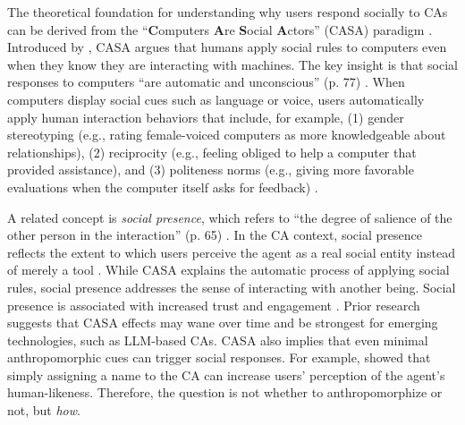 \documentclass[preprint,review,12pt,authoryear,nonatbib]{elsarticle}
\begin{document}
The theoretical foundation for understanding why users respond socially to CAs can be derived from the ``\textbf{C}omputers \textbf{A}re \textbf{S}ocial \textbf{A}ctors'' (CASA) paradigm \parencite{nass2000researching,nass1994computers}. Introduced by \textcite{nass1994computers}, CASA argues that humans apply social rules to computers even when they know they are interacting with machines. The key insight is that social responses to computers ``are automatic and
unconscious'' (p. 77) \parencite{nass1994computers}. When computers display social cues such as language or voice, users automatically apply human interaction behaviors that include, for example, (1) gender stereotyping (e.g., rating female-voiced computers as more knowledgeable about relationships), (2) reciprocity (e.g., feeling obliged to help a computer that provided assistance), and (3) politeness norms (e.g., giving more favorable evaluations when the computer itself asks for feedback) \parencite{nass1997machines}. 

A related concept is \textit{social presence}, which refers to ``the degree of salience of the other person in the interaction'' (p. 65) \parencite{short1976social}. In the CA context, social presence reflects the extent to which users perceive the agent as a real social entity instead of merely a tool \parencite{oh2018systematic}. While CASA explains the automatic process of applying social rules, social presence addresses the sense of interacting with another being. Social presence is associated with increased trust and engagement \parencite{gunawardena1995social}. Prior research \parencite{gambino2020building,koger2023casa} %
suggests that CASA effects may wane over time and be strongest for emerging technologies, such as LLM-based CAs. CASA also implies that even minimal anthropomorphic cues can trigger social responses. For example, \textcite{araujo2018living} showed that simply assigning a name to the CA can increase users' perception of the agent's human-likeness. Therefore, the question is not whether to anthropomorphize or not, but \textit{how}.  %
\end{document}
